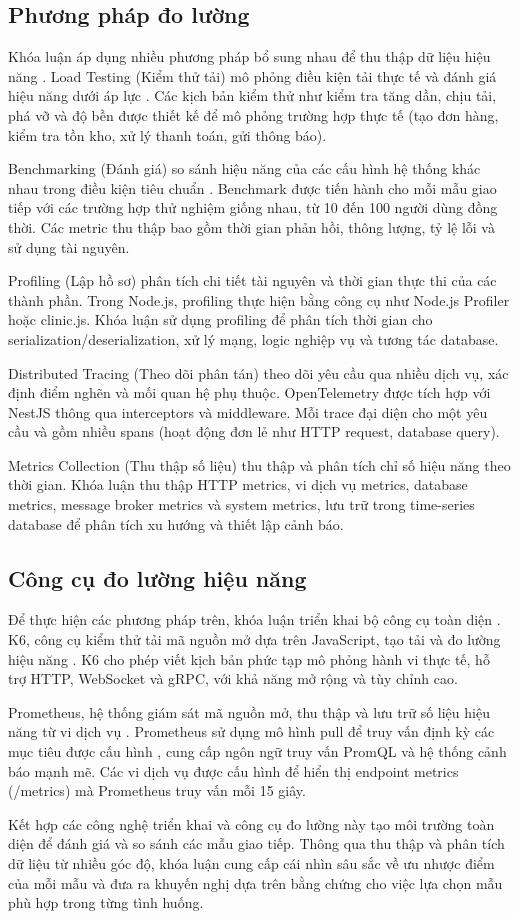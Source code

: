 \subsection{Phương pháp đo lường}
Khóa luận áp dụng nhiều phương pháp bổ sung nhau để thu thập dữ liệu hiệu năng \cite{newman2015}. Load Testing (Kiểm thử tải) mô phỏng điều kiện tải thực tế và đánh giá hiệu năng dưới áp lực \cite{jun2018}. Các kịch bản kiểm thử như kiểm tra tăng dần, chịu tải, phá vỡ và độ bền được thiết kế để mô phỏng trường hợp thực tế (tạo đơn hàng, kiểm tra tồn kho, xử lý thanh toán, gửi thông báo).

Benchmarking (Đánh giá) so sánh hiệu năng của các cấu hình hệ thống khác nhau trong điều kiện tiêu chuẩn \cite{richardson2019}. Benchmark được tiến hành cho mỗi mẫu giao tiếp với các trường hợp thử nghiệm giống nhau, từ 10 đến 100 người dùng đồng thời. Các metric thu thập bao gồm thời gian phản hồi, thông lượng, tỷ lệ lỗi và sử dụng tài nguyên.

Profiling (Lập hồ sơ) phân tích chi tiết tài nguyên và thời gian thực thi của các thành phần. Trong Node.js, profiling thực hiện bằng công cụ như Node.js Profiler hoặc clinic.js. Khóa luận sử dụng profiling để phân tích thời gian cho serialization/deserialization, xử lý mạng, logic nghiệp vụ và tương tác database.

Distributed Tracing (Theo dõi phân tán) theo dõi yêu cầu qua nhiều dịch vụ, xác định điểm nghẽn và mối quan hệ phụ thuộc. OpenTelemetry được tích hợp với NestJS thông qua interceptors và middleware. Mỗi trace đại diện cho một yêu cầu và gồm nhiều spans (hoạt động đơn lẻ như HTTP request, database query).

Metrics Collection (Thu thập số liệu) thu thập và phân tích chỉ số hiệu năng theo thời gian. Khóa luận thu thập HTTP metrics, vi dịch vụ metrics, database metrics, message broker metrics và system metrics, lưu trữ trong time-series database để phân tích xu hướng và thiết lập cảnh báo.

\subsection{Công cụ đo lường hiệu năng}
Để thực hiện các phương pháp trên, khóa luận triển khai bộ công cụ toàn diện \cite{aksakalli2021}. K6, công cụ kiểm thử tải mã nguồn mở dựa trên JavaScript, tạo tải và đo lường hiệu năng \cite{jun2018}. K6 cho phép viết kịch bản phức tạp mô phỏng hành vi thực tế, hỗ trợ HTTP, WebSocket và gRPC, với khả năng mở rộng và tùy chỉnh cao.

Prometheus, hệ thống giám sát mã nguồn mở, thu thập và lưu trữ số liệu hiệu năng từ vi dịch vụ \cite{richardson2019}. Prometheus sử dụng mô hình pull để truy vấn định kỳ các mục tiêu được cấu hình \cite{newman2015}, cung cấp ngôn ngữ truy vấn PromQL và hệ thống cảnh báo mạnh mẽ. Các vi dịch vụ được cấu hình để hiển thị endpoint metrics (/metrics) mà Prometheus truy vấn mỗi 15 giây.

Kết hợp các công nghệ triển khai và công cụ đo lường này tạo môi trường toàn diện để đánh giá và so sánh các mẫu giao tiếp. Thông qua thu thập và phân tích dữ liệu từ nhiều góc độ, khóa luận cung cấp cái nhìn sâu sắc về ưu nhược điểm của mỗi mẫu và đưa ra khuyến nghị dựa trên bằng chứng cho việc lựa chọn mẫu phù hợp trong từng tình huống.